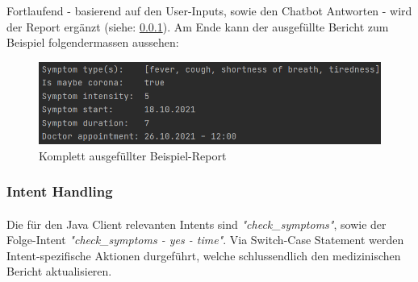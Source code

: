 \documentclass[11pt,a4paper]{article}
\begin{document}
	        	Fortlaufend - basierend auf den User-Inputs, sowie den Chatbot Antworten - wird der Report ergänzt (siehe:
	        	\ref{sssec:intent_handling}). Am Ende kann der ausgefüllte Bericht zum Beispiel folgendermassen aussehen:
				\begin{figure}[h!]
					\begin{center}
        	    		\includegraphics[width=0.8\linewidth]{JavaClient-CompletedReport.png}
		    	        \caption{Komplett ausgefüllter Beispiel-Report}
		        	    \label{fig:javaClient_completedReport}
					\end{center}
		        \end{figure}
		
		\subsubsection{Intent Handling} \label{sssec:intent_handling}
			\paragraph{}
				Die für den Java Client relevanten Intents sind \emph{"check\_symptoms"}, sowie der Folge-Intent 
				\emph{"check\_symptoms - yes - time"}. Via Switch-Case Statement werden Intent-spezifische Aktionen durgeführt,
				welche schlussendlich den medizinischen Bericht aktualisieren. 
				
				
				\newpage
				
\end{document}
